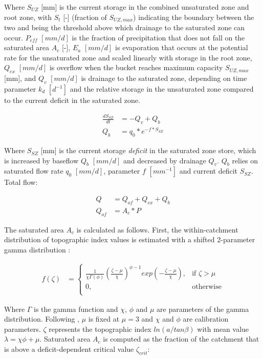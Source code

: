 Where $S_{UZ}$ [mm] is the current storage in the combined unsaturated zone and root zone, with $S_t$ [-] (fraction of $S_{UZ,max}$) indicating the boundary between the two and being the threshold above which drainage to the saturated zone can occur. $P_{eff}$ $[mm/d]$ is the fraction of precipitation that does not fall on the saturated area $A_c$ [-], $E_a$ $[mm/d]$ is evaporation that occurs at the potential rate for the unsaturated zone and scaled linearly with storage in the root zone, $Q_{ex}$ $[mm/d]$ is overflow when the bucket reaches maximum capacity $S_{UZ,max}$ [mm], and $Q_v$ $[mm/d]$ is drainage to the saturated zone, depending on time parameter $k_d$ $[d^{-1}]$ and the relative storage in the unsaturated zone compared to the current deficit in the saturated zone.

\begin{align}
	\frac{dS_{SZ}}{dt} &= -Q_v + Q_b\\
	Q_b &= q_0*e^{-f*S_{SZ}}
\end{align}

Where $S_{SZ}$ [mm] is the current storage \emph{deficit} in the saturated zone store, which is increased by baseflow $Q_b$ $[mm/d]$ and decreased by drainage $Q_v$. $Q_b$ relies on saturated flow rate $q_0$ $[mm/d]$, parameter $f$ $[mm^{-1}]$ and current deficit $S_{SZ}$. Total flow:

\begin{align}
	Q &= Q_{of} + Q_{ex} + Q_b\\
	Q_{of} &= A_c*P
\end{align}

The saturated area $A_c$ is calculated as follows. First, the within-catchment distribution of topographic index values is estimated with a shifted 2-parameter gamma distribution \citep{Sivapalan1987,Clark2008a}:

\begin{align}
	f(\zeta) &= \begin{cases}
		\frac{1}{\chi\Gamma(\phi)}\left(\frac{\zeta-\mu}{\chi}\right)^{\phi-1}exp\left(-\frac{\zeta-\mu}{\chi}\right), & \text{if } \zeta > \mu \\
		0, & \text{otherwise}\\
	\end{cases}
\end{align}

Where $\Gamma$ is the gamma function and $\chi$, $\phi$ and $\mu$ are parameters of the gamma distribution. Following \citet{Clark2008a}, $\mu$ is fixed at $\mu=3$ and $\chi$ and $\phi$ are calibration parameters. $\zeta$ represents the topographic index $ln(a/tan\beta)$ with mean value $\lambda = \chi\phi+\mu$. Saturated area $A_c$ is computed as the fraction of the catchment that is above a deficit-dependent critical value $\zeta_{crit}$: 

